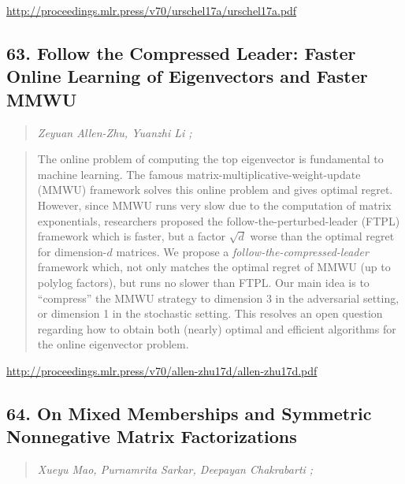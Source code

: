 \documentclass{article}
\begin{document}
\href{http://proceedings.mlr.press/v70/urschel17a/urschel17a.pdf}{http://proceedings.mlr.press/v70/urschel17a/urschel17a.pdf}

\subsection{63. Follow the Compressed Leader: Faster Online Learning of Eigenvectors and Faster MMWU}

\begin{quote}
\footnotesize{\textit{Zeyuan Allen-Zhu, Yuanzhi Li ;}}
\end{quote}

\begin{quote}
    The online problem of computing the top eigenvector is fundamental to machine learning. The famous matrix-multiplicative-weight-update (MMWU) framework solves this online problem and gives optimal regret. However, since MMWU runs very slow due to the computation of matrix exponentials, researchers proposed the follow-the-perturbed-leader (FTPL) framework which is faster, but a factor $\sqrt{d}$ worse than the optimal regret for dimension-$d$ matrices. We propose a \textit{follow-the-compressed-leader} framework which, not only matches the optimal regret of MMWU (up to polylog factors), but runs no slower than FTPL. Our main idea is to “compress” the MMWU strategy to dimension 3 in the adversarial setting, or dimension 1 in the stochastic setting. This resolves an open question regarding how to obtain both (nearly) optimal and efficient algorithms for the online eigenvector problem.  \end{quote}

\href{http://proceedings.mlr.press/v70/allen-zhu17d/allen-zhu17d.pdf}{http://proceedings.mlr.press/v70/allen-zhu17d/allen-zhu17d.pdf}

\subsection{64. On Mixed Memberships and Symmetric Nonnegative Matrix Factorizations}

\begin{quote}
\footnotesize{\textit{Xueyu Mao, Purnamrita Sarkar, Deepayan Chakrabarti ;}}
\end{quote}
\end{document}
